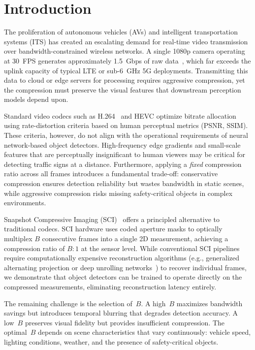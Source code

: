 \documentclass[10pt,journal]{IEEEtran}
\begin{document}

\section{Introduction}

The proliferation of autonomous vehicles (AVs) and intelligent transportation systems (ITS) has created an escalating demand for real-time video transmission over bandwidth-constrained wireless networks. A single 1080p camera operating at 30~FPS generates approximately 1.5~Gbps of raw data~\cite{sullivan2012hevc}, which far exceeds the uplink capacity of typical LTE or sub-6~GHz 5G deployments. Transmitting this data to cloud or edge servers for processing requires aggressive compression, yet the compression must preserve the visual features that downstream perception models depend upon.

Standard video codecs such as H.264~\cite{sullivan2012hevc} and HEVC optimize bitrate allocation using rate-distortion criteria based on human perceptual metrics (PSNR, SSIM). These criteria, however, do not align with the operational requirements of neural network-based object detectors. High-frequency edge gradients and small-scale features that are perceptually insignificant to human viewers may be critical for detecting traffic signs at a distance. Furthermore, applying a \emph{fixed} compression ratio across all frames introduces a fundamental trade-off: conservative compression ensures detection reliability but wastes bandwidth in static scenes, while aggressive compression risks missing safety-critical objects in complex environments.

Snapshot Compressive Imaging (SCI)~\cite{yuan2021sci} offers a principled alternative to traditional codecs. SCI hardware uses coded aperture masks to optically multiplex $B$ consecutive frames into a single 2D measurement, achieving a compression ratio of $B{:}1$ at the sensor level. While conventional SCI pipelines require computationally expensive reconstruction algorithms (e.g., generalized alternating projection or deep unrolling networks~\cite{liu2019cacti}) to recover individual frames, we demonstrate that object detectors can be trained to operate directly on the compressed measurements, eliminating reconstruction latency entirely.

The remaining challenge is the selection of~$B$. A high~$B$ maximizes bandwidth savings but introduces temporal blurring that degrades detection accuracy. A low~$B$ preserves visual fidelity but provides insufficient compression. The optimal~$B$ depends on scene characteristics that vary continuously: vehicle speed, lighting conditions, weather, and the presence of safety-critical objects.
\end{document}
